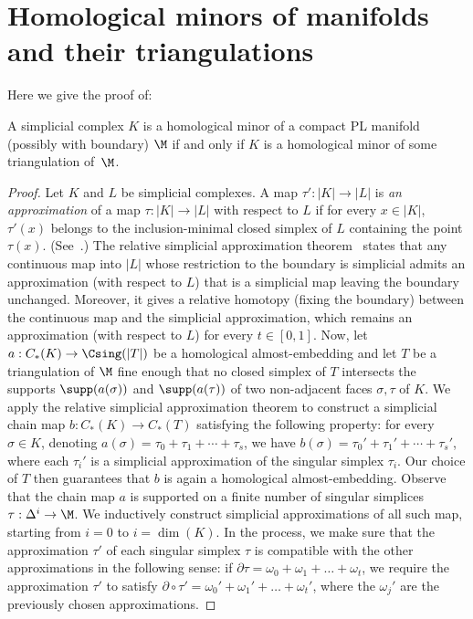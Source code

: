 \section{Homological minors of manifolds and their triangulations}\label{app:simpapp}
%
Here we give the proof of:
%
\setcounter{replemma}{7}
\begin{replemma}
    A simplicial complex $K$ is a homological minor of a compact PL manifold (possibly with boundary) $\M$ if and only if $K$ is a homological minor of some triangulation of~$\M$.
\end{replemma}
\begin{proof}
  Let $K$ and $L$ be simplicial complexes. A map $\tau':|K|\to |L|$ is \emph{an approximation} of a map $\tau:|K|\to |L|$ with respect to $L$ if for every $x\in |K|$, $\tau'(x)$ belongs to the inclusion-minimal closed simplex of $L$ containing the point $\tau(x)$. (See~\cite{zeeman1964relative}.) The relative simplicial approximation theorem~\cite{zeeman1964relative} states that any continuous map into $|L|$ whose restriction to the boundary is simplicial admits an approximation (with respect to $L$) that is a simplicial map leaving the boundary unchanged. Moreover, it gives a relative homotopy (fixing the boundary) between the continuous map and the simplicial approximation, which remains an approximation (with respect to $L$) for every $t\in[0,1]$.
%
\medskip
%
Now, let $a:C_*(K)\to\Csing(|T|)$ be a homological almost-embedding and let $T$ be a triangulation of $\M$ fine enough that no closed simplex of $T$ intersects the supports $\supp(a(\sigma))$ and $\supp(a(\tau))$ of two non-adjacent faces $\sigma,\tau$ of $K$. We apply the relative simplicial approximation theorem to construct a simplicial chain map $b \colon C_*(K)\longrightarrow C_*(T)$ satisfying the following property: for every $\sigma\in K$, denoting $a(\sigma)=\tau_0+\tau_1+\cdots+\tau_s$, we have $b(\sigma)=\tau_0'+\tau_1'+\cdots+\tau_s'$, where each $\tau_i'$ is a simplicial approximation of the singular simplex $\tau_i$. Our choice of $T$ then guarantees that $b$ is again a homological almost-embedding.
%
\medskip
%
Observe that the chain map $a$ is supported on a finite number of singular simplices $\tau:\Delta^i\to \M$. We inductively construct simplicial approximations of all such map, starting from $i=0$ to $i=\dim(K)$. In the process, we make sure that the approximation $\tau'$ of each singular simplex $\tau$ is compatible with the other approximations in the following sense: if $\partial \tau=\omega_0+\omega_1+\ldots+\omega_t$, we require the approximation $\tau'$ to satisfy $\partial\circ \tau'= \omega_0'+\omega_1'+\ldots+\omega_t'$, where the $\omega_j'$ are the previously chosen approximations.

\end{proof}
